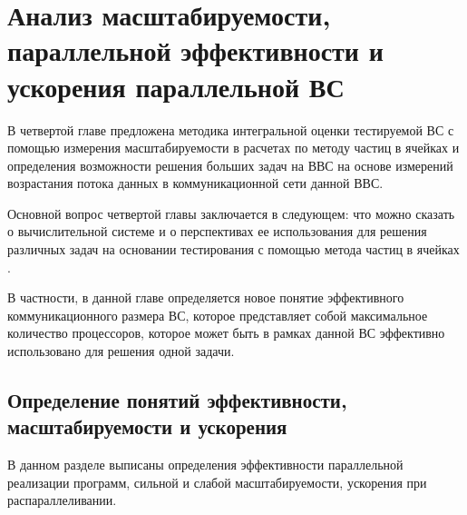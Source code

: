 \chapter{Анализ масштабируемости, параллельной эффективности и ускорения параллельной ВС}
				В четвертой главе предложена методика интегральной оценки тестируемой ВС с помощью измерения масштабируемости в расчетах по методу частиц в ячейках и определения возможности решения больших задач на ВВС на основе измерений возрастания потока данных в коммуникационной сети данной ВВС.

            Основной вопрос четвертой главы заключается в следующем: что можно сказать о вычислительной системе и о перспективах ее использования для решения различных задач на основании тестирования с помощью метода частиц в ячейках
             \cite{MohographyTarkov,VestnikNNSU,multigridAuto,AutoParSilan}. 
            
            В частности, в данной главе определяется новое понятие эффективного коммуникационного размера ВС, которое представляет собой максимальное количество процессоров, которое может быть в рамках данной ВС эффективно использовано для решения одной задачи.  
							
			\section{Определение понятий эффективности, масштабируемости и ускорения}
			
			В данном разделе выписаны определения эффективности параллельной реализации программ, сильной и слабой масштабируемости, ускорения при распараллеливании.
			

